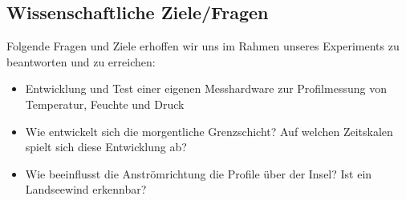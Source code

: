 \documentclass[a4paper,11pt,DIV=calc,tablecaptionabove,headinclude,twoside]{article}
\begin{document}
\subsection{Wissenschaftliche Ziele/Fragen}
Folgende Fragen und Ziele erhoffen wir uns im Rahmen unseres Experiments zu beantworten und zu erreichen:
\begin{itemize}
\item Entwicklung und Test einer eigenen Messhardware zur Profilmessung von
    Temperatur, Feuchte und Druck
\item Wie entwickelt sich die morgentliche Grenzschicht? Auf welchen Zeitskalen spielt sich diese Entwicklung ab?
\item Wie beeinflusst die Anströmrichtung die Profile über der Insel? Ist ein
    Landseewind erkennbar?
\end{itemize}
\end{document}
